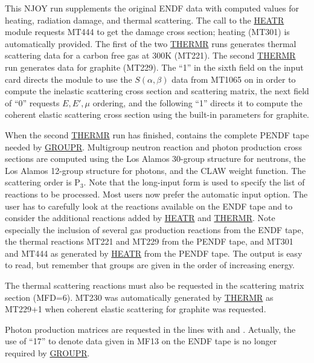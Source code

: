 This NJOY run supplements the original ENDF data with computed
values for heating, radiation damage, and thermal scattering.
The call to the \hyperlink{sHEATRhy}{HEATR} module
requests MT444 to get the damage cross section; heating
(MT301) is automatically provided.  The first of the two
\hyperlink{sTHERMRhy}{THERMR} runs generates thermal scattering data
for a carbon free gas at 300K (MT221).  The second
\hyperlink{sTHERMRhy}{THERMR} run generates
data for graphite (MT229).  The ``1'' in the sixth field
on the input card directs the module to use the $S(\alpha,\beta)$
data from MT1065 on  in order to compute the inelastic
scattering cross section and scattering matrix, the next field of
``0'' requests $E,E',\mu$ ordering, and the following ``1'' directs
it to compute the coherent elastic scattering cross section using
the built-in parameters for graphite.

When the second \hyperlink{sTHERMRhy}{THERMR} run has
finished,  contains the complete PENDF tape needed by
\hyperlink{sGROUPRhy}{GROUPR}.  Multigroup
neutron reaction and photon production cross sections are computed
using the Los Alamos 30-group structure for neutrons, the Los Alamos
12-group structure for photons, and the CLAW weight function.
The scattering order is P$_3$.  Note that the long-input form
is used to specify the list of reactions to be processed.  Most
users now prefer the automatic input option.  The user has to
carefully look at the reactions available on the ENDF tape and
to consider the additional reactions added by
\hyperlink{sHEATRhy}{HEATR} and
\hyperlink{sTHERMRhy}{THERMR}.  Note especially the
inclusion of several gas production reactions
from the ENDF tape, the thermal reactions MT221 and MT229 from
the PENDF tape, and MT301 and MT444 as generated by
\hyperlink{sHEATRhy}{HEATR} from the PENDF tape.  The
output is easy to read, but remember that
groups are given in the order of increasing energy.

The thermal scattering reactions must also be requested in the
scattering matrix section (MFD=6).  MT230 was automatically
generated by \hyperlink{sTHERMRhy}{THERMR} as MT229+1
when coherent elastic scattering
for graphite was requested.

Photon production matrices are requested in the lines with
 and .  Actually, the use of ``17''
to denote data given in MF13 on the ENDF tape is no longer
required by \hyperlink{sGROUPRhy}{GROUPR}.

